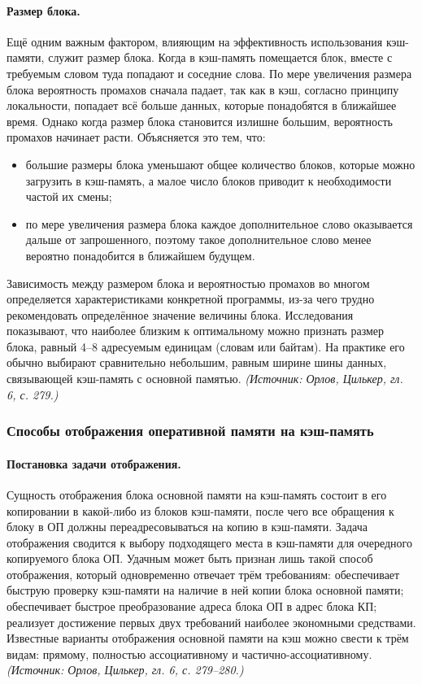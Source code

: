 \documentclass[a4paper,12pt]{article}
\begin{document}
\paragraph{Размер блока.}
Ещё одним важным фактором, влияющим на эффективность использования кэш-памяти, служит размер блока. Когда в кэш-память помещается блок, вместе с требуемым словом туда попадают и соседние слова. По мере увеличения размера блока вероятность промахов сначала падает, так как в кэш, согласно принципу локальности, попадает всё больше данных, которые понадобятся в ближайшее время. Однако когда размер блока становится излишне большим, вероятность промахов начинает расти. Объясняется это тем, что:
\begin{itemize}
\item большие размеры блока уменьшают общее количество блоков, которые можно загрузить в кэш-память, а малое число блоков приводит к необходимости частой их смены;
\item по мере увеличения размера блока каждое дополнительное слово оказывается дальше от запрошенного, поэтому такое дополнительное слово менее вероятно понадобится в ближайшем будущем.
\end{itemize}
Зависимость между размером блока и вероятностью промахов во многом определяется характеристиками конкретной программы, из-за чего трудно рекомендовать определённое значение величины блока. Исследования показывают, что наиболее близким к оптимальному можно признать размер блока, равный 4--8 адресуемым единицам (словам или байтам). На практике его обычно выбирают сравнительно небольшим, равным ширине шины данных, связывающей кэш-память с основной памятью.
\textit{(Источник: Орлов, Цилькер, гл. 6, с. 279.)}

\subsubsection{Способы отображения оперативной памяти на кэш-память}

\paragraph{Постановка задачи отображения.}
Сущность отображения блока основной памяти на кэш-память состоит в его копировании в какой-либо из блоков кэш-памяти, после чего все обращения к блоку в ОП должны переадресовываться на копию в кэш-памяти. Задача отображения сводится к выбору подходящего места в кэш-памяти для очередного копируемого блока ОП. Удачным может быть признан лишь такой способ отображения, который одновременно отвечает трём требованиям: обеспечивает быструю проверку кэш-памяти на наличие в ней копии блока основной памяти; обеспечивает быстрое преобразование адреса блока ОП в адрес блока КП; реализует достижение первых двух требований наиболее экономными средствами. Известные варианты отображения основной памяти на кэш можно свести к трём видам: прямому, полностью ассоциативному и частично-ассоциативному.
\textit{(Источник: Орлов, Цилькер, гл. 6, с. 279--280.)}
\end{document}
